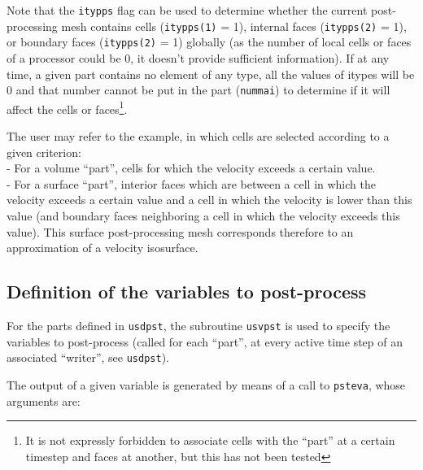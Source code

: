 {{{Note that the \texttt{itypps} flag can be used to determine
whether the current post-processing mesh contains cells
(\texttt{itypps(1)} = 1), internal faces (\texttt{itypps(2)} = 1), or
boundary faces (\texttt{itypps(2)} = 1) globally (as the number of local cells
 or faces of a processor could be 0, it doesn't provide sufficient
 information).
 If at any time, a given part contains no element of any type, all the
 values of itypes will be 0 and that number cannot be put in the part
(\texttt {nummai}) to determine if it will affect the cells or
faces\footnote{It is not expressly forbidden to associate cells with the
``part'' at a certain timestep and faces at another, but this has not been tested}.

The user may refer to the example, in which cells are selected according
to a given criterion: \\
- For a volume ``part'', cells for which the velocity exceeds a certain
value. \\
- For a surface ``part'', interior faces which are between a cell in
which the velocity exceeds a certain value and a cell in which the
velocity is lower than this value (and boundary faces neighboring a
cell in which the velocity exceeds this value). This surface
post-processing mesh corresponds therefore to an approximation of a
velocity isosurface.

\subsection{Definition of the variables to post-process}

For the parts defined in \texttt{usdpst}, the subroutine \texttt{usvpst}
is used to specify the variables to post-process (called for each ``part'', at every active time step of an
associated ``writer'', see \texttt{usdpst}).

The output of a given variable is generated by means of a call to
\texttt{psteva}, whose arguments are:

}}}
